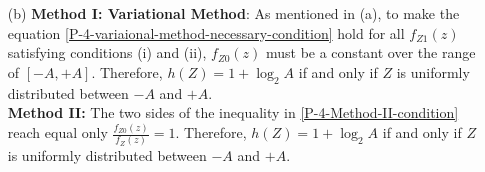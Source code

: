 \documentclass{assignment}
\begin{document}
\begin{sol}
\begin{itemize}
        \item[(b)] \textbf{Method I: Variational Method}: As mentioned in (a), to make the equation \ref{P-4-variaional-method-necessary-condition} hold for all $f_{Z1}(z)$ satisfying conditions (i) and (ii), $f_{Z0}(z)$ must be a constant over the range of $[-A,+A]$. Therefore, $h(Z)=1+\log_2A$ if and only if $Z$ is uniformly distributed between $-A$ and $+A$.\\
        \textbf{Method II:} The two sides of the inequality in \ref{P-4-Method-II-condition} reach equal only $\frac{f_{Z0}(z)}{f_Z(z)}=1$. Therefore, $h(Z)=1+\log_2A$ if and only if $Z$ is uniformly distributed between $-A$ and $+A$.
    \end{itemize}
\end{sol}
\end{document}
